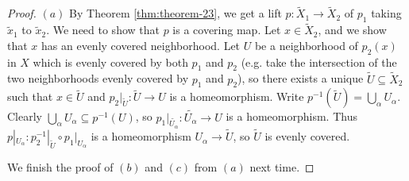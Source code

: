 \begin{proof}
  $(a)$ By Theorem \ref{thm:theorem-23}, we get a lift
  $p : \widetilde{X}_1 \to \widetilde{X}_2$ of
  $p_1$ taking $\widetilde{x}_1$ to $\widetilde{x}_2$.
  We need to show that $p$ is a covering map.
  Let $x \in \widetilde{X}_2$, and we show that $x$ has
  an evenly covered neighborhood. Let
  $U$ be a neighborhood of $p_2(x)$ in $X$ which is
  evenly covered by both $p_1$ and $p_2$ (e.g. take the
  intersection of the two neighborhoods evenly covered by
  $p_1$ and $p_2$), so there exists a unique
  $\widetilde{U} \subseteq \widetilde{X}_2$ such that
  $x \in \widetilde{U}$ and
  $p_2|_{\widetilde{U}} : \widetilde{U} \to U$ is a homeomorphism.
  Write $p^{-1}(\widetilde{U}) = \bigcup_{\alpha} U_\alpha$.
  Clearly $\bigcup_\alpha U_\alpha \subseteq p^{-1}(U)$, so
  $p_1|_{\widetilde{U_\alpha}} : \widetilde{U_\alpha} \to U$ is a homeomorphism.
  Thus $p|_{U_\alpha} : p_2^{-1}|_{\widetilde{U}} \circ p_1|_{U_\alpha}$
  is a homeomorphism $U_\alpha \to \widetilde{U}$, so
  $\widetilde{U}$ is evenly covered.

  We finish the proof of $(b)$ and $(c)$ from $(a)$ next time.
\end{proof}
